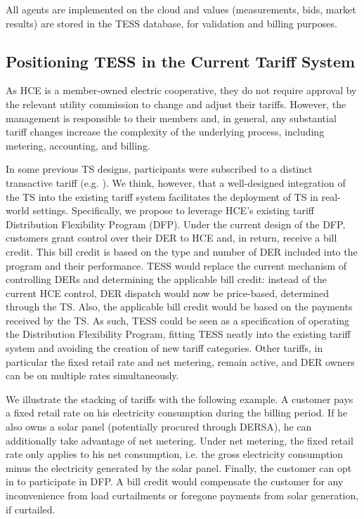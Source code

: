 \documentclass[12pt]{article}{Definitions/mdpi}
\begin{document}
All agents are implemented on the cloud and values (measurements, bids, market results) are stored in the TESS database, for validation and billing purposes.

\subsection{Positioning TESS in the Current Tariff System}\label{sec:position_tariff_system}

As HCE is a member-owned electric cooperative, they do not require approval by the relevant utility commission to change and adjust their tariffs. However, the management is responsible to their members and, in general, any substantial tariff changes increase the complexity of the underlying process, including metering, accounting, and billing. 

In some previous TS designs, participants were subscribed to a distinct transactive tariff (e.g. \citet{Widergren2014}).
We think, however, that a well-designed integration of the TS into the existing tariff system facilitates the deployment of TS in real-world settings. Specifically, we propose to leverage HCE's existing tariff Distribution Flexibility Program (DFP). Under the current design of the DFP, customers grant control over their DER to HCE and, in return, receive a bill credit. This bill credit is based on the type and number of DER included into the program and their performance. TESS would replace the current mechanism of controlling DERs and determining the applicable bill credit: instead of the current HCE control, DER dispatch would now be price-based, determined through the TS. Also, the applicable bill credit would be based on the payments received by the TS. As such, TESS could be seen as a specification of operating the Distribution Flexibility Program, fitting TESS neatly into the existing tariff system and avoiding the creation of new tariff categories.
Other tariffs, in particular the fixed retail rate and net metering, remain active, and DER owners can be on multiple rates simultaneously. 

We illustrate the stacking of tariffs with the following example. A customer pays a fixed retail rate on his electricity consumption during the billing period. 
If he also owns a solar panel (potentially procured through DERSA), he can additionally take advantage of net metering. Under net metering, the fixed retail rate only applies to his net consumption, i.e. the gross electricity consumption minus the electricity generated by the solar panel. 
Finally, the customer can opt in to participate in DFP. A bill credit would compensate the customer for any inconvenience from load curtailments or foregone payments from solar generation, if curtailed.
\end{document}

